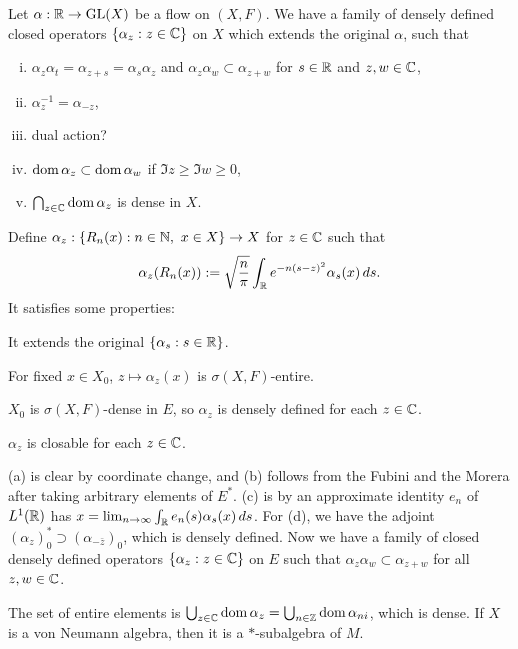 \documentclass{../../../small}
\begin{document}
\begin{prop}
Let $\alpha:\mathbb{R}\to\mathrm{GL}(X)$ be a flow on $(X,F)$.
We have a family of densely defined closed operators $\{\alpha_z:z\in\mathbb{C}\}$ on $X$ which extends the original $\alpha$, such that
\begin{enumerate}[(i)]
\item $\alpha_z\alpha_t=\alpha_{z+s}=\alpha_s\alpha_z$ and $\alpha_z\alpha_w\subset\alpha_{z+w}$ for $s\in\mathbb{R}$ and $z,w\in\mathbb{C}$,
\item $\alpha_z^{-1}=\alpha_{-z}$,
\item dual action?
\item $\operatorname{dom}\alpha_z\subset\operatorname{dom}\alpha_w$ if $\Im z\ge\Im w\ge0$,
\item $\bigcap_{z\in\mathbb{C}}\operatorname{dom}\alpha_z$ is dense in $X$.
\end{enumerate}
\end{prop}
\begin{pf}
Define $\alpha_z:\{R_n(x):n\in\mathbb{N},\ x\in X\}\to X$ for $z\in\mathbb{C}$ such that
\[\alpha_z(R_n(x)):=\sqrt{\frac n\pi}\int_{\mathbb{R}} e^{-n(s-z)^2}\alpha_s(x)\,ds.\]
It satisfies some properties:
\begin{parts}
\item It extends the original $\{\alpha_s:s\in\mathbb{R}\}$.
\item For fixed $x\in X_0$, $z\mapsto\alpha_z(x)$ is $\sigma(X,F)$-entire.
\item $X_0$ is $\sigma(X,F)$-dense in $E$, so $\alpha_z$ is densely defined for each $z\in\mathbb{C}$.
\item $\alpha_z$ is closable for each $z\in\mathbb{C}$.
\end{parts}
(a) is clear by coordinate change, and (b) follows from the Fubini and the Morera after taking arbitrary elements of $E^*$.
(c) is by an approximate identity $e_n$ of $L^1(\mathbb{R})$ has $x=\lim_{n\to\infty}\int_{\mathbb{R}} e_n(s)\alpha_s(x)\,ds$.
For (d), we have the adjoint $(\alpha_z)_0^*\supset(\alpha_{-\bar z})_0$, which is densely defined.
Now we have a family of closed densely defined operators $\{\alpha_z:z\in\mathbb{C}\}$ on $E$ such that $\alpha_z\alpha_w\subset\alpha_{z+w}$ for all $z,w\in\mathbb{C}$.
\end{pf}

\begin{defn}
The set of entire elements is $\bigcup_{z\in\mathbb{C}}\operatorname{dom}\alpha_z=\bigcup_{n\in\mathbb{Z}}\operatorname{dom}\alpha_{ni}$, which is dense.
If $X$ is a von Neumann algebra, then it is a $*$-subalgebra of $M$.

\end{defn}
\end{document}
